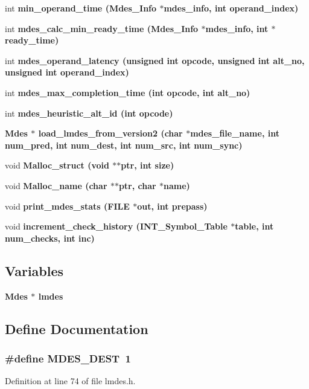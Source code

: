\begin{CompactItemize}
\item 
int \bf{min\_\-operand\_\-time} (\bf{Mdes\_\-Info} $\ast$mdes\_\-info, int operand\_\-index)
\item 
int \bf{mdes\_\-calc\_\-min\_\-ready\_\-time} (\bf{Mdes\_\-Info} $\ast$mdes\_\-info, int $\ast$ready\_\-time)
\item 
int \bf{mdes\_\-operand\_\-latency} (unsigned int opcode, unsigned int alt\_\-no, unsigned int operand\_\-index)
\item 
int \bf{mdes\_\-max\_\-completion\_\-time} (int opcode, int alt\_\-no)
\item 
int \bf{mdes\_\-heuristic\_\-alt\_\-id} (int opcode)
\item 
\bf{Mdes} $\ast$ \bf{load\_\-lmdes\_\-from\_\-version2} (char $\ast$mdes\_\-file\_\-name, int num\_\-pred, int num\_\-dest, int num\_\-src, int num\_\-sync)
\item 
void \bf{Malloc\_\-struct} (void $\ast$$\ast$ptr, int size)
\item 
void \bf{Malloc\_\-name} (char $\ast$$\ast$ptr, char $\ast$\bf{name})
\item 
void \bf{print\_\-mdes\_\-stats} (FILE $\ast$out, int prepass)
\item 
void \bf{increment\_\-check\_\-history} (\bf{INT\_\-Symbol\_\-Table} $\ast$table, int num\_\-checks, int inc)
\end{CompactItemize}
\subsection*{Variables}
\begin{CompactItemize}
\item 
\bf{Mdes} $\ast$ \bf{lmdes}
\end{CompactItemize}


\subsection{Define Documentation}
\subsubsection{\setlength{\rightskip}{0pt plus 5cm}\#define MDES\_\-DEST~1}\label{lmdes_8h_6b7b3b9d34884591f194e9362a4d787e}




Definition at line 74 of file lmdes.h.

